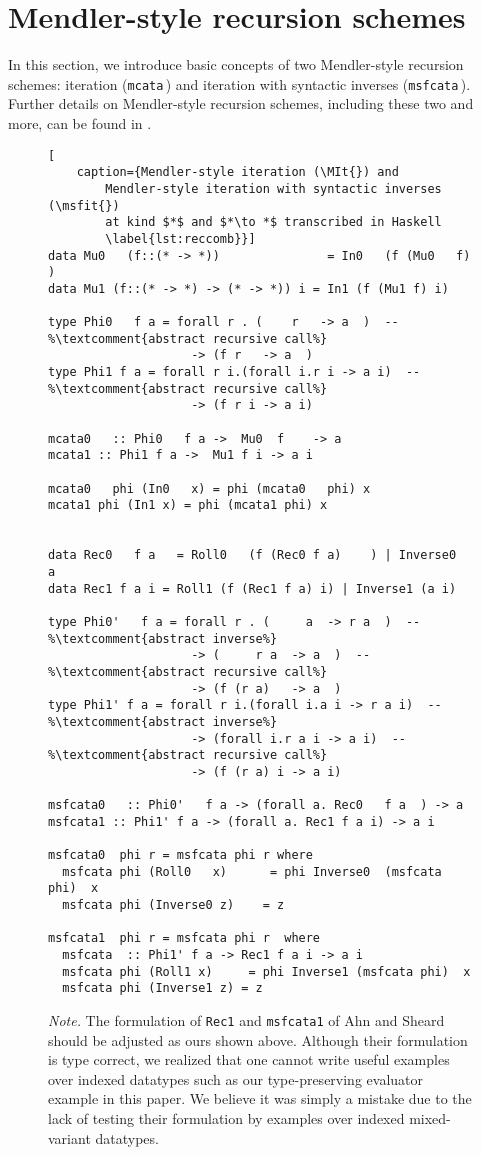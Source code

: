 \section{Mendler-style recursion schemes}
\label{sec:mendler}
In this section, we introduce basic concepts of two Mendler-style recursion
schemes: iteration (\lstinline{mcata}\,) and iteration with syntactic inverses
(\lstinline{msfcata}\,). Further details on Mendler-style recursion schemes,
including these two and more,
can be found in \cite{AhnShe11,AbeMatUus05,UusVen00,AbeMat04}.

\begin{figure}
\begin{lstlisting}[
	caption={Mendler-style iteration (\MIt{}) and
		Mendler-style iteration with syntactic inverses (\msfit{})
		at kind $*$ and $*\to *$ transcribed in Haskell
		\label{lst:reccomb}}]
data Mu0   (f::(* -> *))               = In0   (f (Mu0   f)  )
data Mu1 (f::(* -> *) -> (* -> *)) i = In1 (f (Mu1 f) i)

type Phi0   f a = forall r . (    r   -> a  )  -- %\textcomment{abstract recursive call%}
                    -> (f r   -> a  )
type Phi1 f a = forall r i.(forall i.r i -> a i)  -- %\textcomment{abstract recursive call%}
                    -> (f r i -> a i)

mcata0   :: Phi0   f a ->  Mu0  f    -> a
mcata1 :: Phi1 f a ->  Mu1 f i -> a i

mcata0   phi (In0   x) = phi (mcata0   phi) x
mcata1 phi (In1 x) = phi (mcata1 phi) x


data Rec0   f a   = Roll0   (f (Rec0 f a)    ) | Inverse0   a
data Rec1 f a i = Roll1 (f (Rec1 f a) i) | Inverse1 (a i)

type Phi0'   f a = forall r . (     a  -> r a  )  -- %\textcomment{abstract inverse%}
                    -> (     r a  -> a  )  -- %\textcomment{abstract recursive call%}
                    -> (f (r a)   -> a  )
type Phi1' f a = forall r i.(forall i.a i -> r a i)  -- %\textcomment{abstract inverse%}
                    -> (forall i.r a i -> a i)  -- %\textcomment{abstract recursive call%}
                    -> (f (r a) i -> a i)

msfcata0   :: Phi0'   f a -> (forall a. Rec0   f a  ) -> a
msfcata1 :: Phi1' f a -> (forall a. Rec1 f a i) -> a i

msfcata0  phi r = msfcata phi r where
  msfcata phi (Roll0   x)      = phi Inverse0  (msfcata phi)  x
  msfcata phi (Inverse0 z)    = z

msfcata1  phi r = msfcata phi r  where
  msfcata  :: Phi1' f a -> Rec1 f a i -> a i
  msfcata phi (Roll1 x)     = phi Inverse1 (msfcata phi)  x
  msfcata phi (Inverse1 z) = z
\end{lstlisting}

\textit{Note. }
The formulation of \lstinline{Rec1} and \lstinline{msfcata1} of
Ahn and Sheard \cite{AhnShe11} should be adjusted as ours
shown above. Although their formulation is type correct, we
realized that one cannot write useful examples over indexed
datatypes such as our type-preserving evaluator example in this paper.
We believe it was simply a mistake due to the lack of testing their
formulation by examples over indexed mixed-variant datatypes.
\end{figure}

